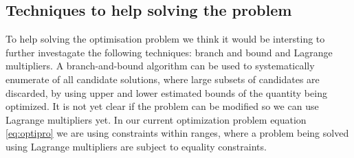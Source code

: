 \subsection{Techniques to help solving the problem}
To help solving the optimisation problem we think it would be intersting to further investagate the following techniques: branch and bound and Lagrange multipliers.
A branch-and-bound algorithm can be used to systematically enumerate  of all candidate solutions, where large subsets of candidates are discarded, by using upper and lower estimated bounds of the quantity being optimized. 
It is not yet clear if the problem can be modified so we can use Lagrange multipliers yet. In our current optimization problem equation \ref{eq:optipro} we are using constraints within ranges, where a problem being solved using Lagrange multipliers are subject to equality constraints.



